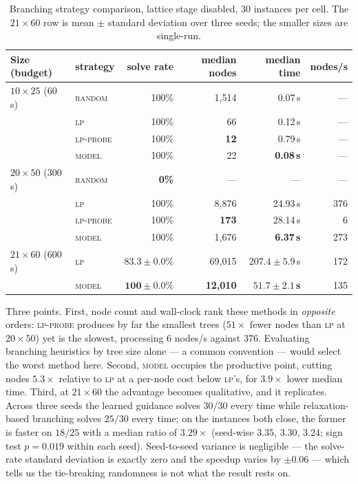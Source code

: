 \documentclass[11pt]{article}
\begin{document}
\begin{table}[h]
\centering
\begin{tabular}{llrrrr}
\toprule
Size (budget) & strategy & solve rate & median nodes & median time & nodes/s \\
\midrule
$10\times25$ (60\,s) & \textsc{random} & 100\% & 1{,}514 & 0.07\,s & --- \\
 & \textsc{lp} & 100\% & 66 & 0.12\,s & --- \\
 & \textsc{lp-probe} & 100\% & \textbf{12} & 0.79\,s & --- \\
 & \textsc{model} & 100\% & 22 & \textbf{0.08\,s} & --- \\
\midrule
$20\times50$ (300\,s) & \textsc{random} & \textbf{0\%} & --- & --- & --- \\
 & \textsc{lp} & 100\% & 8{,}876 & 24.93\,s & 376 \\
 & \textsc{lp-probe} & 100\% & \textbf{173} & 28.14\,s & 6 \\
 & \textsc{model} & 100\% & 1{,}676 & \textbf{6.37\,s} & 273 \\
\midrule
$21\times60$ (600\,s) & \textsc{lp} & $83.3\pm0.0\%$ & 69{,}015 & $207.4\pm5.9$\,s & 172 \\
 & \textsc{model} & $\mathbf{100\pm0.0\%}$ & \textbf{12{,}010} & $\mathbf{51.7\pm2.1}$\,\textbf{s} & 135 \\
\bottomrule
\end{tabular}
\caption{Branching strategy comparison, lattice stage disabled, $30$ instances per cell. The $21\times60$ row is mean $\pm$ standard deviation over three seeds; the smaller sizes are single-run.}
\label{tab:search}
\end{table}

Three points. First, node count and wall-clock rank these methods in \emph{opposite} orders: \textsc{lp-probe} produces by far the smallest trees ($51\times$ fewer nodes than \textsc{lp} at $20\times50$) yet is the slowest, processing $6$ nodes/s against $376$. Evaluating branching heuristics by tree size alone --- a common convention --- would select the worst method here. Second, \textsc{model} occupies the productive point, cutting nodes $5.3\times$ relative to \textsc{lp} at a per-node cost below \textsc{lp}'s, for $3.9\times$ lower median time. Third, at $21\times60$ the advantage becomes qualitative, and it replicates. Across three seeds the learned guidance solves $30/30$ every time while relaxation-based branching solves $25/30$ every time; on the instances both close, the former is faster on $18/25$ with a median ratio of $3.29\times$ (seed-wise $3.35$, $3.30$, $3.24$; sign test $p=0.019$ within each seed). Seed-to-seed variance is negligible --- the solve-rate standard deviation is exactly zero and the speedup varies by $\pm0.06$ --- which tells us the tie-breaking randomness is not what the result rests on.
\end{document}
